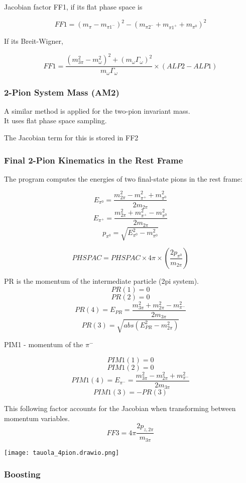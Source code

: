 \documentclass[12pt]{article}
\begin{document}
Jacobian factor FF1, if its flat phase space is

\[FF1 = (m_\pi - m_{\pi1^-})^2 - ( m_{\pi2^-} + m_{\pi1^+} + m_{\pi^0})^2\]

If its Breit-Wigner,

\[FF1 = \frac{(m_{3\pi}^2 -m_\omega^2)^2 + (m_\omega \Gamma_\omega)^2}{m_\omega \Gamma_\omega} \times (ALP2-ALP1)\]

\subsubsection{2-Pion System Mass (AM2)}

A similar method is applied for the two-pion invariant mass.\\
It uses flat phase space sampling.

The Jacobian term for this is stored in FF2

\subsubsection{Final 2-Pion Kinematics in the Rest Frame}
The program computes the energies of two final-state pions in the rest frame:

\[E_{\pi^0} = \frac{m_{2\pi}^2- m_{\pi^+}^2+m_{\pi^0}^2}{2m_{2\pi}}\]
\[E_{\pi^+} = \frac{m_{2\pi}^2+ m_{\pi^+}^2-m_{\pi^0}^2}{2m_{2\pi}}\]
\[p_{\pi^0} = \sqrt{E_{\pi^0}^2 - m_{\pi^0}^2}\]

\[PHSPAC = PHSPAC \times 4\pi \times (\frac{2 p_{\pi^0}}{m_{2\pi}}) \]








PR is the momentum of the intermediate particle (2pi system). \\

\[PR(1) = 0\]
\[PR(2) = 0\]
\[PR(4) = E_{PR} = \frac{m_{3\pi}^2+m_{2\pi}^2- m_{\pi^-}^2}{2m_{3\pi}}\]
\[PR(3) = \sqrt{abs(E_{PR}^2-m_{2\pi}^2)} \]

PIM1 - momentum of the $\pi^-$

\[PIM1(1) = 0\]
\[PIM1(2) = 0\]
\[PIM1(4) = E_{\pi^-} = \frac{m_{3\pi}^2-m_{2\pi}^2+ m_{\pi^-}^2}{2m_{3\pi}}\]
\[PIM1(3) = -PR(3)\]

This following factor accounts for the Jacobian when transforming between momentum variables.
\[FF3 = 4\pi\frac{2 p_{z,2\pi}}{m_{3\pi}}\]


\texttt{[image: tauola\_4pion.drawio.png]}

\subsubsection{Boosting}
\end{document}
